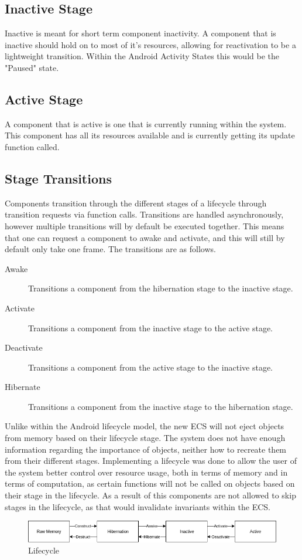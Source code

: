 \subsection{Inactive Stage}
Inactive is meant for short term component inactivity.
A component that is inactive should hold on to most of it's resources, allowing for reactivation to be a lightweight transition.
Within the Android Activity States this would be the "Paused" state\cite[Activity state and ejection from memory]{android_activity_lifecycle}.

\subsection{Active Stage}
A component that is active is one that is currently running within the system.
This component has all its resources available and is currently getting its update function called.

\subsection{Stage Transitions}
Components transition through the different stages of a lifecycle through transition requests via function calls.
Transitions are handled asynchronously, however multiple transitions will by default be executed together.
This means that one can request a component to awake and activate, and this will still by default only take one frame.
The transitions are as follows.
\begin{description}
    \item
    [Awake] Transitions a component from the hibernation stage to the inactive stage.

    \item
    [Activate] Transitions a component from the inactive stage to the active stage.

    \item
    [Deactivate] Transitions a component from the active stage to the inactive stage.

    \item
    [Hibernate] Transitions a component from the inactive stage to the hibernation stage.
\end{description}

Unlike within the Android lifecycle model, the new ECS will not eject objects from memory based on their lifecycle stage\cite[Activity state and ejection from memory]{android_activity_lifecycle}.
The system does not have enough information regarding the importance of objects, neither how to recreate them from their different stages.
Implementing a lifecycle was done to allow the user of the system better control over resource usage, both in terms of memory
and in terms of computation, as certain functions will not be called on objects based on their stage in the lifecycle.
As a result of this components are not allowed to skip stages in the lifecycle, as that would invalidate invariants within the ECS.

\begin{figure}[tbp]
    \begin{center}
    \includegraphics[scale=0.5]{images/lifecycle_horizontal.png}
    \caption{Lifecycle}
    \label{fig:lifecycle}
    \end{center}
\end{figure}
